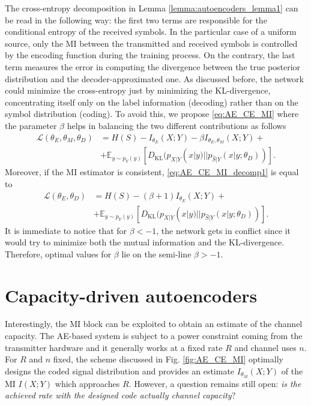 The cross-entropy decomposition in Lemma \ref{lemma:autoencoders_lemma1} can be read in the following way: the first two terms are responsible for the conditional entropy of the received symbols. In the particular case of a uniform source, only the MI between the transmitted and received symbols is controlled by the encoding function during the training process. On the contrary, the last term measures the error in computing the divergence between the true posterior distribution and the decoder-approximated one. As discussed before, the network could minimize the cross-entropy just by minimizing the KL-divergence, concentrating itself only on the label information (decoding) rather than on the symbol distribution (coding). To avoid this, we propose \eqref{eq:AE_CE_MI} where the parameter $\beta$ helps in balancing the two different contributions as follows
\begin{align}
\label{eq:AE_CE_MI_decomp1}
\mathcal{L}(\theta_E,\theta_M, \theta_D) &= H(S)-I_{\theta_E}(X;Y)-\beta I_{\theta_E, \theta_M}(X;Y)+ \nonumber \\ 
&+\mathbb{E}_{y\sim p_Y(y)}[D_{\text{KL}}(p_{X|Y}(x|y)||p_{\hat{S}|Y}(x|y;\theta_D))].
\end{align}
Moreover, if the MI estimator is consistent, \eqref{eq:AE_CE_MI_decomp1} is equal to
\begin{align}
\label{eq:AE_CE_MI_decomp2}
\mathcal{L}(\theta_E, \theta_D) &= H(S)-(\beta+1)I_{\theta_E}(X;Y)+ \nonumber \\ 
&+\mathbb{E}_{y\sim p_Y(y)}[D_{\text{KL}}(p_{X|Y}(x|y)||p_{\hat{S}|Y}(x|y;\theta_D))].
\end{align}
It is immediate to notice that for $\beta<-1$, the network gets in conflict since it would try to minimize both the mutual information and the KL-divergence. Therefore, optimal values for $\beta$ lie on the semi-line $\beta>-1$.

\section{Capacity-driven autoencoders}
\label{sec:autoencoders_capacity}
Interestingly, the MI block can be exploited to obtain an estimate of the channel capacity. The AE-based system is subject to a power constraint coming from the transmitter hardware and it generally works at a fixed rate $R$ and channel uses $n$. For $R$ and $n$ fixed, the scheme discussed in Fig. \ref{fig:AE_CE_MI} optimally designs the coded signal distribution and provides an estimate $I_{\theta_M}(X;Y)$ of the MI $I(X;Y)$ which approaches $R$. However, a question remains still open: \textit{is the achieved rate with the designed code actually channel capacity}?

